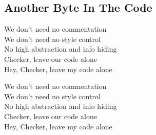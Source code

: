 \subsection{Another Byte In The Code}
We don’t need no commentation \\
We don’t need no style control \\
No high abstraction and info hiding \\
Checker, leave our code alone \\
 Hey, Checker, leave my code alone \\


We don’t need no commentation \\
We don’t need no style control \\
No high abstraction and info hiding \\
Checker, leave our code alone \\
Hey, Checker, leave my code alone \\


\vspace*{3cm}

\begin{center}
\end{center}

\pagebreak
